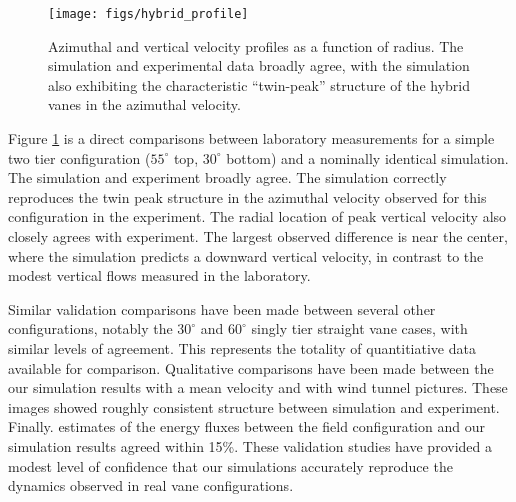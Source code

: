   \begin{figure}[!htb]
    \begin{center}
     \texttt{[image: figs/hybrid\_profile]}
     \caption{Azimuthal and vertical velocity profiles as a function of
     radius. The simulation and experimental data broadly agree, with
     the simulation also exhibiting the characteristic ``twin-peak''
     structure of the hybrid vanes in the azimuthal velocity. }
     \label{fig:lab}
    \end{center}
  \end{figure}

Figure \ref{fig:lab} is a direct comparisons between laboratory measurements for a simple 
two tier configuration ($55^{\circ}$ top, $30^{\circ}$ bottom) and 
a nominally identical simulation. The simulation and experiment broadly
agree. The simulation correctly reproduces the twin peak structure in
the azimuthal velocity observed for this configuration in the
experiment. The radial location of peak vertical velocity also closely
agrees with experiment. The largest observed difference is near the
center, where the simulation predicts a downward vertical velocity, in
contrast to the modest vertical flows measured in the laboratory.  

Similar validation comparisons have been made between several other
configurations, notably the $30^{\circ}$ and $60^{\circ}$ singly tier
straight vane cases, with similar levels of agreement. This represents
the totality of quantitiative data available for comparison. Qualitative
comparisons have been made between the our simulation results with a
mean velocity and with wind tunnel pictures. These images showed roughly
consistent structure between simulation and
experiment. Finally. estimates of the energy fluxes between the field
configuration and our simulation results agreed within 15\%. These
validation studies have provided a modest level of confidence that our
simulations accurately reproduce the dynamics observed in real vane
configurations. 

%
% 
%
% 
%
%
%
%

